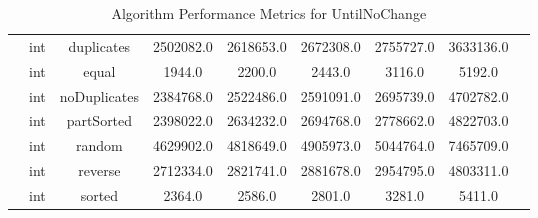 \documentclass{article}
\begin{document}
\begin{table}[H]
\begin{tabular}{|c|c|c|c|c|c|c|c|c|}
        & int & duplicates & 2502082.0 & 2618653.0 & 2672308.0 & 2755727.0 & 3633136.0 \\
        & int & equal & 1944.0 & 2200.0 & 2443.0 & 3116.0 & 5192.0 \\
        & int & noDuplicates & 2384768.0 & 2522486.0 & 2591091.0 & 2695739.0 & 4702782.0 \\
        & int & partSorted & 2398022.0 & 2634232.0 & 2694768.0 & 2778662.0 & 4822703.0 \\
        & int & random & 4629902.0 & 4818649.0 & 4905973.0 & 5044764.0 & 7465709.0 \\
        & int & reverse & 2712334.0 & 2821741.0 & 2881678.0 & 2954795.0 & 4803311.0 \\
        & int & sorted & 2364.0 & 2586.0 & 2801.0 & 3281.0 & 5411.0 \\
        \bottomrule
    \end{tabular}
    \caption{Algorithm Performance Metrics for UntilNoChange}
\end{table}
\end{document}
